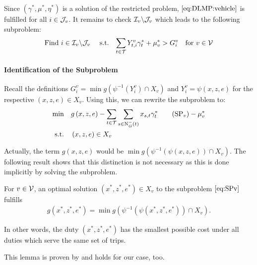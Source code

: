 Since $\left(\gamma^*,\mu^*,\eta^*\right)$ is a solution of the restricted problem, $\eqref{eq:DLMP:vehicle}$ is fulfilled for all $i\in\mathcal{J}_v$. It remains to check $\mathcal{I}_v\backslash\mathcal{J}_v$ which leads to the following subproblem:
\begin{align}
	\text{Find } i\in\mathcal{I}_v\backslash\mathcal{J}_v && \text{ s.t.} && \sum_{t\in\mathcal{T}}Y^v_{t,i}\gamma^*_t + \mu^*_v > G^v_i && \text{for } v\in\mathcal{V} \label{eq:DLMP:index}
\end{align}

\newpage

\paragraph{Identification of the Subproblem} \parfill

Recall the definitions ${G^v_i = \min g\left(\psi^{-1}\left(Y^v_i\right)\cap X_v\right)}$ and ${Y^v_i = \psi(x,z,e)}$ for the respective ${(x,z,e)\in X_v}$. Using this, we can rewrite the subproblem to: 
\begin{align*}
	\min \quad & g\left(x,z,e\right)-\sum_{t\in\mathcal{T}}\sum_{s\in\Nin(t)}x_{s,t}\gamma^*_t \tag{$\operatorname{SP}_v$} - \mu^*_v \label{eq:SPv} \\
	\text{s.t.} \quad & \left(x,z,e\right)\in X_v
\end{align*}

Actually, the term $g(x,z,e)$ would be ${\min g\left(\psi^{-1}\left(\psi(x,z,e)\right)\cap X_v\right)}$. The following result shows that this distinction is not necessary as this is done implicitly by solving the subproblem.

\begin{lemma}

For $v\in\mathcal{V}$, an optimal solution ${\left(x^*,z^*,e^*\right)\in X_v}$ to the subproblem $\eqref{eq:SPv}$ fulfills
\begin{align*}
	g\left(x^*,z^*,e^*\right) = \min g\left(\psi^{-1}\left(\psi\left(x^*,z^*,e^*\right)\right)\cap X_v\right).
\end{align*}

In other words, the duty $\left(x^*,z^*,e^*\right)$ has the smallest possible cost under all duties which serve the same set of trips.

\end{lemma}

This lemma is proven by \cite[pp.~42-43]{Kaiser} and holds for our case, too.

